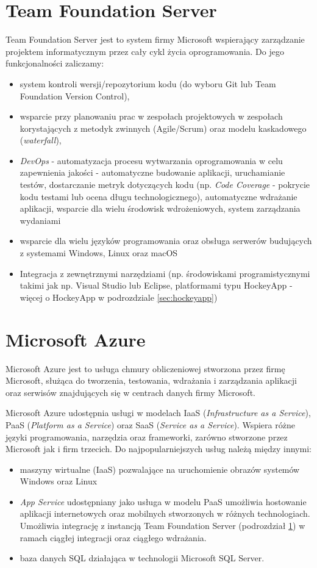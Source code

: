 \section{Team Foundation Server}
\label{sec:team}
Team Foundation Server jest to system firmy Microsoft wspierający zarządzanie projektem informatycznym przez cały cykl życia oprogramowania.
Do jego funkcjonalności zaliczamy:
\begin{itemize}
\item system kontroli wersji/repozytorium kodu (do wyboru Git lub Team Foundation Version Control)\cite{Kontrola99:online},
\item wsparcie przy planowaniu prac w zespołach projektowych w zespołach korystających z metodyk zwinnych (Agile/Scrum) oraz modelu kaskadowego (\textit{waterfall})\cite{Narzedzi82:online},
\item \textit{DevOps} - automatyzacja procesu wytwarzania oprogramowania w celu zapewnienia jakości - automatyczne budowanie aplikacji, uruchamianie testów, dostarczanie metryk dotyczących kodu (np. \textit{Code Coverage} - pokrycie kodu testami lub ocena długu technologicznego), automatyczne wdrażanie aplikacji, wsparcie dla wielu środowisk wdrożeniowych, system zarządzania wydaniami\cite{Ciaglain95:online}
\item wsparcie dla wielu języków programowania oraz obsługa serwerów budujących z systemami Windows, Linux oraz macOS \cite{Buildand77:online}
\item Integracja z zewnętrznymi narzędziami (np. środowiskami programistycznymi takimi jak np. Visual Studio lub Eclipse, platformami typu HockeyApp - więcej o HockeyApp w podrozdziale \ref{sec:hockeyapp})
\end{itemize}
\section{Microsoft Azure}
\label{sec:azure}
Microsoft Azure jest to usługa chmury obliczeniowej stworzona przez firmę Microsoft, służąca do tworzenia, testowania, wdrażania i zarządzania aplikacji oraz serwisów znajdujących się w centrach danych firmy Microsoft.

Microsoft Azure udostępnia usługi w modelach IaaS (\textit{Infrastructure as a Service}), PaaS (\textit{Platform as a Service}) oraz SaaS (\textit{Service as a Service}). Wspiera różne języki programowania, narzędzia oraz frameworki, zarówno stworzone przez Microsoft jak i firm trzecich. 
\newpage
Do najpopularniejszych usług należą między innymi:
\begin{itemize}
\item maszyny wirtualne (IaaS) pozwalające na uruchomienie obrazów systemów Windows oraz Linux
\item \textit{App Service} udostępniany jako usługa w modelu PaaS umożliwia hostowanie aplikacji internetowych oraz mobilnych stworzonych w różnych technologiach. Umożliwia integrację z instancją Team Foundation Server (podrozdział \ref{sec:team}) w ramach ciągłej integracji oraz ciągłego wdrażania.
\item baza danych SQL działająca w technologii Microsoft SQL Server.
\end{itemize}
